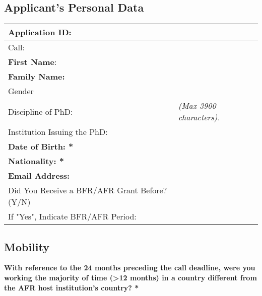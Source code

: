 %

\subsection{Applicant's Personal Data}

\begin{table}[H]
    \centering\small
    \begin{tabular}{|p{}|p{}|}
        \hline
        Application ID:        & \\\hline
        Call:                  & \\\hline
        \textbf{First Name}:   &  \\\hline
        \textbf{Family Name:}  & \\\hline
        Gender                 & \\\hline
        Discipline of PhD:     & \emph{(Max 3900 characters).}

        \\\hline
        Institution Issuing the PhD: & \\\hline
        \textbf{Date of Birth: *} & \\\hline
        \textbf{Nationality: *}   & \\\hline
        \textbf{Email Address:}   & \\\hline
        Did You Receive a BFR/AFR Grant Before? (Y/N) & \\\hline
        If "Yes", Indicate BFR/AFR Period: & \\
       \hline
    \end{tabular}
\end{table}

\subsection{Mobility}

\textbf{With reference to the 24 months preceding the call deadline, were you working the majority of time (>12 months) in a country different from the AFR host institution's country? *}

